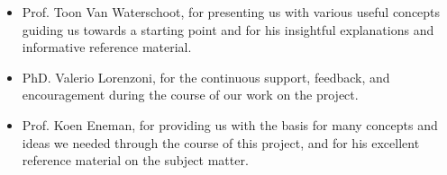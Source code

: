 \begin{itemize}
  \item Prof. Toon Van Waterschoot, for presenting us with various useful concepts guiding us towards a starting point and for his insightful explanations and informative reference material.
  \item PhD. Valerio Lorenzoni, for the continuous support, feedback, and encouragement during the course of our work on the project.
  \item Prof. Koen Eneman, for providing us with the basis for many concepts and ideas we needed through the course of this project, and for his excellent reference material on the subject matter.
\end{itemize}
